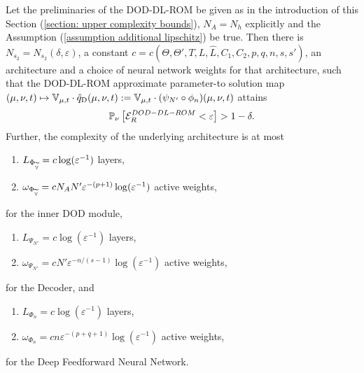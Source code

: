 \begin{theorem} \label{theo: PAC bound for DOD-DL-ROM}
    Let the preliminaries of the DOD-DL-ROM be given as in the introduction of this Section 
    (\ref{section: upper complexity bounds}), $N_A = N_h$ explicitly and the Assumption 
    (\ref{assumption additional lipschitz}) be true.
    Then there is $N_{s_2} = N_{s_2}(\delta, \varepsilon)$, 
    a constant $c = c(\Theta, \Theta', T, L, \hat{L}, C_1, C_2, p, q, n, s, s')$,
    an architecture and a choice of neural network weights for that architecture, such that
    the DOD-DL-ROM approximate parameter-to solution map $(\mu, \nu, t) \mapsto \mathbb{V}_{\mu, t} \cdot 
    \hat{q}_\text{D}(\mu, \nu, t) :=
    \mathbb{V}_{\mu, t} \cdot (\psi_{N'} \circ \phi_n)(\mu, \nu, t)$
    attains
    \begin{equation*}
        \mathbb{P}_\nu\left[\mathcal{E}^{DOD-DL-ROM}_R < \varepsilon\right] > 1 - \delta.
    \end{equation*}
    Further, the complexity of the underlying architecture is at most
    \begin{enumerate}
        \item[-] $L_{\Phi_{\widetilde{\mathbb{V}}}} = c \log(\varepsilon^{-1})$ layers,
        \item[-] $\omega_{\Phi_{\widetilde{\mathbb{V}}}} = cN_A N' \varepsilon^{-(p+1)} \log(\varepsilon^{-1})$ active weights,
    \end{enumerate}
    for the inner DOD module,
    \begin{enumerate}
        \item[-] $L_{\Psi_{N'}} = c \log(\varepsilon^{-1})$ layers,
        \item[-] $\omega_{\Psi_{N'}} = cN' \varepsilon^{-n/(s-1)} \log(\varepsilon^{-1})$ active weights,
    \end{enumerate}
    for the Decoder, and
    \begin{enumerate}
        \item[-] $L_{\Phi_n} = c \log(\varepsilon^{-1})$ layers,
        \item[-] $\omega_{\Phi_n} = cn \varepsilon^{-(p+q+1)} \log(\varepsilon^{-1})$ active weights,
    \end{enumerate}
    for the Deep Feedforward Neural Network.
\end{theorem}
